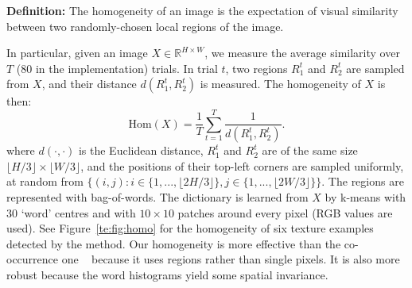 \noindent 
\textbf{Definition:} The homogeneity of an image is the expectation of
visual similarity between two randomly-chosen local regions of the image.

In particular, given an image $X \in \mathbb{R}^{H\times W}$, we
measure the average similarity over $T$ ($80$ in the implementation)
trials.  In trial $t$, two regions $R_1^t$ and $R_2^t$ are sampled
from $X$, and their distance $d(R_1^t, R_2^t)$ is measured. The
homogeneity of $X$ is then:
\begin{equation}
  \label{eq:repet}
\text{Hom}(X) = \frac{1}{T}\sum_{t=1}^T \frac{1}{d(R_1^t, R_2^t)}.  
\end{equation}
where $d(\cdot, \cdot)$ is the Euclidean distance, $R_1^t$ and $R_2^t$
are of the same size $\lfloor H/3 \rfloor \times \lfloor W/3 \rfloor$,
and the positions of their top-left corners are sampled uniformly, at
random from $\{(i,j): i\in\{1, ..., \lfloor 2H/3 \rfloor \}, j\in \{1,
..., \lfloor 2W/3 \rfloor \} \}$.  The regions are represented with
bag-of-words. The dictionary is learned from $X$ by k-means with $30$
`word' centres and with $10\times 10$ patches around every pixel (RGB
values are used). See Figure~\ref{te:fig:homo} for the homogeneity of six
texture examples detected by the method.  Our homogeneity is more
effective than the co-occurrence one ~\citep{texture:analysis} because
it uses regions rather than single pixels. It is also more robust
because the word histograms yield some spatial invariance. 
 

